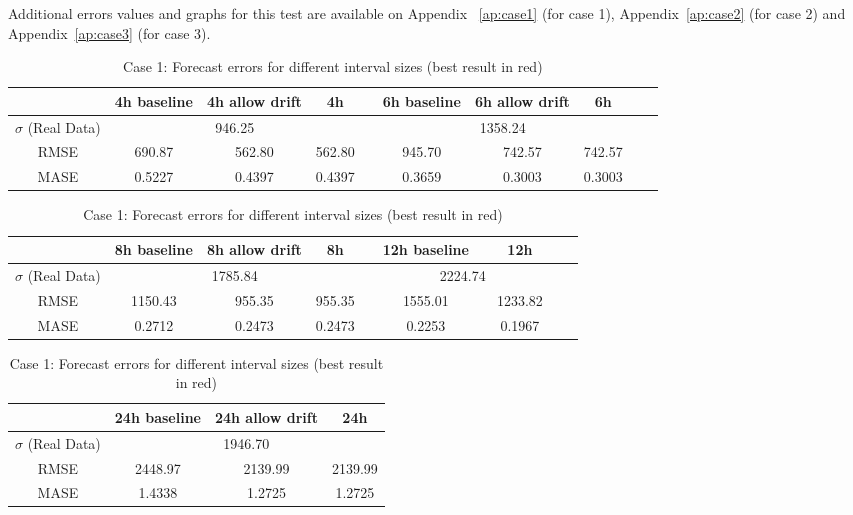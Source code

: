 Additional errors values and graphs for this test are available on Appendix
~\ref{ap:case1} (for case 1), Appendix~\ref{ap:case2} (for case 2) and Appendix~\ref{ap:case3}
(for case 3).

\begin{table}[!ht]
\footnotesize
\begin{tabular}{c|ccccccccc}
              & 4h baseline & 4h allow drift & 4h     &  & 6h baseline & 6h allow drift & 6h     &  &  \\ \hline
$\sigma$ (Real Data) & \multicolumn{3}{c}{946.25}           &  & \multicolumn{3}{c}{1358.24}           &  &  \\
RMSE          & 690.87      & 562.80         & 562.80 &  & 945.70      & 742.57         & 742.57 &  &  \\
MASE          & 0.5227      & 0.4397         & 0.4397 &  & 0.3659      & 0.3003         & 0.3003 &  & 
\end{tabular}

\vspace{0.5cm}

\begin{tabular}{c|ccccccccc}
              & 8h baseline & 8h allow drift & 8h     &  & 12h baseline & \color{red}{12h allow drift} & 12h     &  &  \\ \hline
$\sigma$ (Real Data) & \multicolumn{3}{c}{1785.84}           &  & \multicolumn{3}{c}{2224.74}           &  &  \\
RMSE          & 1150.43     & 955.35         & 955.35 &  & 1555.01     & \color{red}{1233.82}     & 1233.82 &  &  \\
MASE          & 0.2712      & 0.2473         & 0.2473 &  & 0.2253      & \color{red}{0.1967}      & 0.1967 &  & 
\end{tabular}

\vspace{0.5cm}

\begin{tabular}{c|ccc}
              & 24h baseline & 24h allow drift & 24h  \\ \hline
$\sigma$ (Real Data) & \multicolumn{3}{c}{1946.70}     \\
RMSE          & 2448.97     & 2139.99        & 2139.99   \\
MASE          & 1.4338      & 1.2725         & 1.2725 \\
\end{tabular}

\vspace{0.5cm}

\caption{Case 1: Forecast errors for different interval sizes (best result in
red)}\label{tab:case1_interval}
\end{table}




